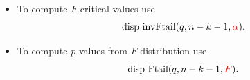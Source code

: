 \documentclass[notes=show,compress,beamer]{beamer}
\begin{document}
\begin{frame}%


\begin{itemize}
\item To compute $F$ critical values use 
\begin{equation*}
\text{disp invFtail}(q,n-k-1,%
\color{red}%
\alpha 
\color{black}%
).
\end{equation*}%
\pause%

\item To compute $p$-values from $F$ distribution use 
\begin{equation*}
\text{disp Ftail}(q,n-k-1,%
\color{red}%
F%
\color{black}%
).
\end{equation*}
\end{itemize}

\end{frame}%
\end{document}
